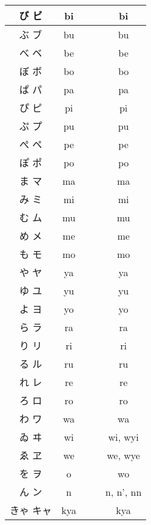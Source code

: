 \documentclass{article}
\begin{document}
\begin{center}
\begin{japanese}
\begin{longtable}{|c|c c c|c|}
                び ビ & bi &&& bi \\ \hline
                ぶ ブ & bu &&& bu \\ \hline
                べ ベ & be &&& be \\ \hline
                ぼ ボ & bo &&& bo \\ \hline
                ぱ パ & pa &&& pa \\ \hline
                ぴ ピ & pi &&& pi \\ \hline
                ぷ プ & pu &&& pu \\ \hline
                ぺ ペ & pe &&& pe \\ \hline
                ぽ ポ & po &&& po \\ \hline
                ま マ & ma &&& ma \\ \hline
                み ミ & mi &&& mi \\ \hline
                む ム & mu &&& mu \\ \hline
                め メ & me &&& me \\ \hline
                も モ & mo &&& mo \\ \hline
                や ヤ & ya &&& ya \\ \hline
                ゆ ユ & yu &&& yu \\ \hline
                よ ヨ & yo &&& yo \\ \hline
                ら ラ & ra &&& ra \\ \hline
                り リ & ri &&& ri \\ \hline
                る ル & ru &&& ru \\ \hline
                れ レ & re &&& re \\ \hline
                ろ ロ & ro &&& ro \\ \hline
                わ ワ & wa &&& wa \\ \hline
                ゐ ヰ & wi &&& wi, wyi \\ \hline
                ゑ ヱ & we &&& we, wye \\ \hline
                を ヲ & o &&& wo \\ \hline
                ん ン & n &&& n, n', nn \\ \hline
                きゃ キャ & kya &&& kya \\ \hline

\end{longtable}
\end{japanese}
\end{center}
\end{document}

